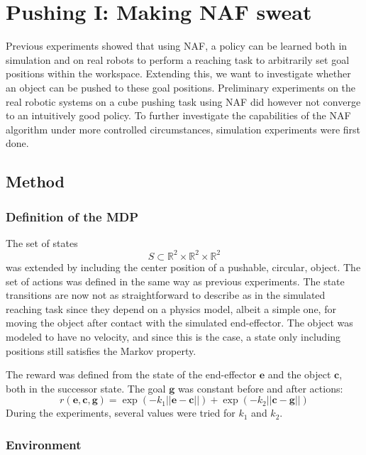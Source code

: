 \chapter{Pushing I: Making NAF sweat}
\label{sec:push_sim_1}

Previous experiments showed that using NAF, a policy can be learned both in
simulation and on real robots to perform a reaching task to arbitrarily set
goal positions within the workspace. Extending this, we want to investigate
whether an object can be pushed to these goal positions. Preliminary
experiments on the real robotic systems on a cube pushing task using NAF did
however not converge to an intuitively good policy. To further investigate the
capabilities of the NAF algorithm under more controlled circumstances,
simulation experiments were first done.

\section{Method}

\subsection{Definition of the MDP}

The set of states
\begin{equation}
    S \subset \mathbb{R}^2 \times \mathbb{R}^2 \times \mathbb{R}^2
\end{equation}
was extended by including the center position of a pushable, circular, object.
The set of actions was defined in the same way as previous experiments. The
state transitions are now not as straightforward to describe as in the
simulated reaching task since they depend on a physics model, albeit a simple
one, for moving the object after contact with the simulated end-effector. The
object was modeled to have no velocity, and since this is the case, a state
only including positions still satisfies the Markov property.

The reward was defined from the state of the end-effector $\mathbf{e}$ and the
object $\mathbf{c}$, both in the successor state. The goal $\mathbf{g}$ was constant
before and after actions:
\begin{equation}
    r(\mathbf{e, c, g}) = \exp ( -k_1 ||\mathbf{e - c}||) + \exp (-k_2 ||\mathbf{c - g}|| )
\end{equation}
During the experiments, several values were tried for $k_1$ and $k_2$.

\subsection{Environment}

